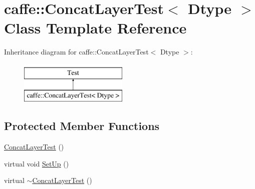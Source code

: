\hypertarget{classcaffe_1_1_concat_layer_test}{\section{caffe\+:\+:Concat\+Layer\+Test$<$ Dtype $>$ Class Template Reference}
\label{classcaffe_1_1_concat_layer_test}
}
Inheritance diagram for caffe\+:\+:Concat\+Layer\+Test$<$ Dtype $>$\+:\begin{figure}[H]
\begin{center}
\leavevmode
\includegraphics[height=2.000000cm]{classcaffe_1_1_concat_layer_test}
\end{center}
\end{figure}
\subsection*{Protected Member Functions}
\begin{DoxyCompactItemize}
\item 
\hyperlink{classcaffe_1_1_concat_layer_test_aee8ce0e8390e1c3753c5420202e5e598}{Concat\+Layer\+Test} ()
\item 
virtual void \hyperlink{classcaffe_1_1_concat_layer_test_a7c47be870fc60bab24bd882d64310401}{Set\+Up} ()
\item 
virtual \hyperlink{classcaffe_1_1_concat_layer_test_a66a184a925ea6949ffe9ae9140689227}{$\sim$\+Concat\+Layer\+Test} ()
\end{DoxyCompactItemize}
